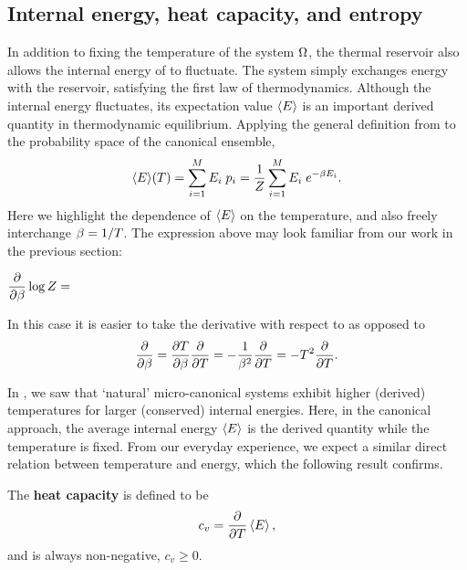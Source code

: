 \subsection{\label{sec:canon_derived}Internal energy, heat capacity, and entropy}
In addition to fixing the temperature of the system $\Omega$, the thermal reservoir also allows the internal energy of \Om to fluctuate.
The system simply exchanges energy with the reservoir, satisfying the first law of thermodynamics.
Although the internal energy fluctuates, its expectation value $\left\langle E \right\rangle$ is an important derived quantity in thermodynamic equilibrium.
Applying the general definition from  to the probability space of the canonical ensemble,
\begin{equation*}
  \left\langle E \right\rangle\!(T) = \sum_{i = 1}^M E_i \; p_i = \frac{1}{Z} \sum_{i = 1}^M E_i \; e^{-\beta E_i}.
\end{equation*}
Here we highlight the dependence of $\left\langle E \right\rangle$ on the temperature, and also freely interchange $\beta = 1 / T$.
\newpage %
\noindent
The expression above may look familiar from our work in the previous section:
\begin{mdframed}
  $\displaystyle \frac{\partial }{\partial \beta} \log Z = $ \\[100 pt]
\end{mdframed}
In this case it is easier to take the derivative with respect to \be as opposed to
\begin{equation}
  \label{eq:beta_T}
  \frac{\partial }{\partial \beta} = \frac{\partial T}{\partial \beta} \frac{\partial }{\partial T} = -\frac{1}{\beta^2} \frac{\partial }{\partial T} = -T^2 \frac{\partial }{\partial T}.
\end{equation}

In , we saw that `natural' micro-canonical systems exhibit higher (derived) temperatures for larger (conserved) internal energies.
Here, in the canonical approach, the average internal energy $\left\langle E \right\rangle$ is the derived quantity while the temperature is fixed.
From our everyday experience, we expect a similar direct relation between temperature and energy, which the following result confirms.

\begin{shaded}
  The \textbf{heat capacity} is defined to be
  \begin{equation}
    \label{eq:heat_cap}
    c_v = \frac{\partial }{\partial T} \left\langle E \right\rangle,
  \end{equation}
  and is always non-negative, $c_v \geq 0$.
\end{shaded}

